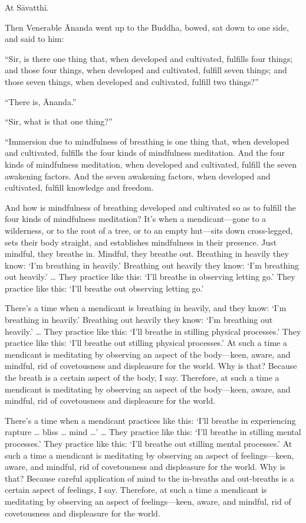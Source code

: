 \documentclass[12pt,openany]{book}%
\begin{document}
At \textsanskrit{Sāvatthī}. 

Then Venerable Ānanda went up to the Buddha, bowed, sat down to one side, and said to him: 

“Sir, is there one thing that, when developed and cultivated, fulfills four things; and those four things, when developed and cultivated, fulfill seven things; and those seven things, when developed and cultivated, fulfill two things?” 

“There is, Ānanda.” 

“Sir, what is that one thing?” 

“Immersion due to mindfulness of breathing is one thing that, when developed and cultivated, fulfills the four kinds of mindfulness meditation. And the four kinds of mindfulness meditation, when developed and cultivated, fulfill the seven awakening factors. And the seven awakening factors, when developed and cultivated, fulfill knowledge and freedom. 

And how is mindfulness of breathing developed and cultivated so as to fulfill the four kinds of mindfulness meditation? It’s when a mendicant—gone to a wilderness, or to the root of a tree, or to an empty hut—sits down cross-legged, sets their body straight, and establishes mindfulness in their presence. Just mindful, they breathe in. Mindful, they breathe out. Breathing in heavily they know: ‘I’m breathing in heavily.’ Breathing out heavily they know: ‘I’m breathing out heavily.’ … They practice like this: ‘I’ll breathe in observing letting go.’ They practice like this: ‘I’ll breathe out observing letting go.’ 

There’s a time when a mendicant is breathing in heavily, and they know: ‘I’m breathing in heavily.’ Breathing out heavily they know: ‘I’m breathing out heavily.’ … They practice like this: ‘I’ll breathe in stilling physical processes.’ They practice like this: ‘I’ll breathe out stilling physical processes.’ At such a time a mendicant is meditating by observing an aspect of the body—keen, aware, and mindful, rid of covetousness and displeasure for the world. Why is that? Because the breath is a certain aspect of the body, I say. Therefore, at such a time a mendicant is meditating by observing an aspect of the body—keen, aware, and mindful, rid of covetousness and displeasure for the world. 

There’s a time when a mendicant practices like this: ‘I’ll breathe in experiencing rapture … bliss … mind …’ … They practice like this: ‘I’ll breathe in stilling mental processes.’ They practice like this: ‘I’ll breathe out stilling mental processes.’ At such a time a mendicant is meditating by observing an aspect of feelings—keen, aware, and mindful, rid of covetousness and displeasure for the world. Why is that? Because careful application of mind to the in-breaths and out-breaths is a certain aspect of feelings, I say. Therefore, at such a time a mendicant is meditating by observing an aspect of feelings—keen, aware, and mindful, rid of covetousness and displeasure for the world. 
\end{document}
